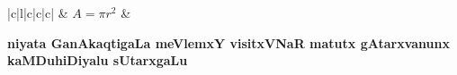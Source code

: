 \begin{landscape}
\begin{center}
\begin{longtable}{|c|l|c|c|c|}
& 
$A=\pi r^{2}$ &
\\
\hline
\end{longtable}
\end{center}

\begin{center}
{\large\bf niyata GanAkaqtigaLa meVlemxY visitxVNaR matutx gAtarxvanunx
 kaMDuhiDiyalu sUtarxgaLu}
\medskip

{\large\bf {}
 }

\smallskip


\end{center}
\end{landscape}
